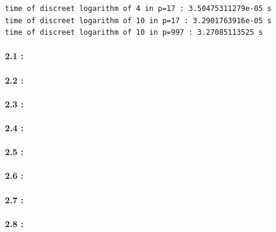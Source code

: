 \documentclass[11pt,a4paper]{report}
\begin{document}
\begin{verbatim}
time of discreet logarithm of 4 in p=17 : 3.50475311279e-05 s
time of discreet logarithm of 10 in p=17 : 3.2901763916e-05 s
time of discreet logarithm of 10 in p=997 : 3.27085113525 s
\end{verbatim}

\paragraph*{2.1 : } 

\paragraph*{2.2 : } 

\paragraph*{2.3 : } 

\paragraph*{2.4 : } 

\paragraph*{2.5 : } 

\paragraph*{2.6 : } 

\paragraph*{2.7 : } 

\paragraph*{2.8 : } 
\end{document}
